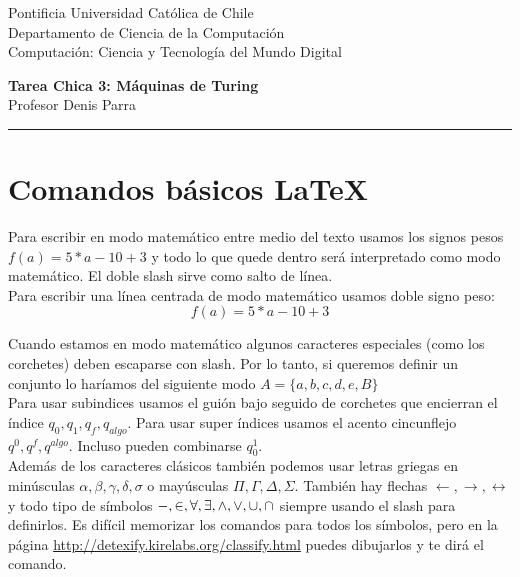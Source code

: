 \documentclass[12pt]{article}
\begin{document}
\begin{flushleft}
{\footnotesize Pontificia Universidad Católica de Chile\\
Departamento de Ciencia de la Computación\\
Computación: Ciencia y Tecnología del Mundo Digital\\
}
\begin{center}
{\huge\bf Tarea Chica 3: Máquinas de Turing}\\ \vspace{0.5cm}
Profesor Denis Parra \\

\rule{\linewidth}{0.1mm}
\end{center}
\end{flushleft}

\section*{Comandos básicos \LaTeX}

Para escribir en modo matemático entre medio del texto usamos los signos pesos $f(a) = 5 * a - 10 + 3$ y todo lo que quede dentro será interpretado como modo matemático. El doble slash sirve como salto de línea. \\

Para escribir una línea centrada de modo matemático usamos doble signo peso:
$$f(a) = 5 * a - 10 + 3$$

Cuando estamos en modo matemático algunos caracteres especiales (como los corchetes) deben escaparse con slash. Por lo tanto, si queremos definir un conjunto lo haríamos del siguiente modo $A = \{a, b, c, d, e, B\}$\\

Para usar subindices usamos el guión bajo seguido de corchetes que encierran el índice $q_{0}, q_{1}, q_{f}, q_{algo}$. Para usar super índices usamos el acento cincunflejo $q^{0}, q^{f}, q^{algo}$. Incluso pueden combinarse $q_{0}^{1}$.\\

Además de los caracteres clásicos también podemos usar letras griegas en minúsculas $\alpha, \beta, \gamma, \delta, \sigma$ o mayúsculas $\Pi, \Gamma, \Delta, \Sigma$. También hay flechas $\leftarrow, \rightarrow, \leftrightarrow$ y todo tipo de símbolos $\--, \in, \forall, \exists, \wedge, \vee, \cup, \cap$ siempre usando el slash para definirlos. Es difícil memorizar los comandos para todos los símbolos, pero en la página \url{http://detexify.kirelabs.org/classify.html} puedes dibujarlos y te dirá el comando. \\
\end{document}
